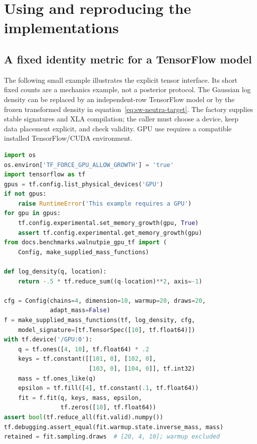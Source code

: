\section{Using and reproducing the implementations}
\label{sec:sw-reproduce}

\subsection{A fixed identity metric for a TensorFlow model}

The following small example illustrates the explicit tensor interface. Its
short fixed counts are a mechanics example, not a posterior protocol. The
Gaussian log density can be replaced by an independent-row TensorFlow model
or by the frozen transformed density in equation~\eqref{eq:sw-neutra-target}.
The factory supplies stable signatures and XLA compilation; the caller must
choose a device, keep data placement explicit, and check validity. GPU use
requires a compatible installed TensorFlow/CUDA environment.

\begin{lstlisting}[language=Python,basicstyle=\ttfamily\scriptsize,breaklines=true]
import os
os.environ['TF_FORCE_GPU_ALLOW_GROWTH'] = 'true'
import tensorflow as tf
gpus = tf.config.list_physical_devices('GPU')
if not gpus:
    raise RuntimeError('This example requires a GPU')
for gpu in gpus:
    tf.config.experimental.set_memory_growth(gpu, True)
    assert tf.config.experimental.get_memory_growth(gpu)
from docs.benchmarks.walnutpie_gpu_tf import (
    Config, make_supplied_mass_functions)

def log_density(q, location):
    return -.5 * tf.reduce_sum((q-location)**2, axis=-1)

cfg = Config(chains=4, dimension=10, warmup=20, draws=20,
             adapt_mass=False)
f = make_supplied_mass_functions(tf, log_density, cfg,
    model_signature=[tf.TensorSpec([10], tf.float64)])
with tf.device('/GPU:0'):
    q = tf.ones([4, 10], tf.float64) * .2
    keys = tf.constant([[101, 0], [102, 0],
                        [103, 0], [104, 0]], tf.int32)
    mass = tf.ones_like(q)
    epsilon = tf.fill([4], tf.constant(.1, tf.float64))
    fit = f.fit(q, keys, mass, epsilon,
                tf.zeros([10], tf.float64))
assert bool(tf.reduce_all(fit.valid).numpy())
tf.debugging.assert_equal(fit.warmup.state.inverse_mass, mass)
retained = fit.sampling.draws  # [20, 4, 10]; warmup excluded
\end{lstlisting}

